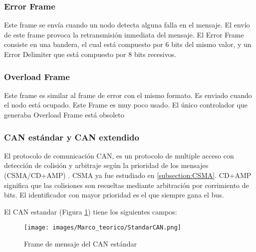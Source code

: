\subsubsection{Error Frame}
Este frame se envía cuando un nodo detecta alguna falla en el mensaje. El envío de este frame provoca la retransmisión inmediata del mensaje. El Error Frame consiste en una bandera, el cual está compuesto por 6 bits del mismo valor, y un Error Delimiter que está compuesto por 8 bits recesivos.

\subsubsection{Overload Frame}
Este frame es similar al frame de error con el mismo formato. Es enviado cuando el nodo está ocupado. Este Frame es muy poco usado. El único controlador que generaba Overload Frame está obsoleto \citep{kvaserWEB}

\subsubsection{CAN estándar y CAN extendido}
El protocolo de comunicación CAN, es un protocolo de multiple acceso con detección de colisión y arbitraje según la prioridad de los mensajes (CSMA/CD+AMP) \citep{texasCAN}. CSMA ya fue estudiado en \ref{subsection:CSMA}. CD+AMP significa que las colisiones son resueltas mediante arbitración por corrimiento de bits. El identificador con mayor prioridad es el que siempre gana el bus.

El CAN estandar (Figura \ref{fig:StandarCAN}) tiene los siguientes campos:

\begin{figure}[h]
 \centering
 \texttt{[image: images/Marco\_teorico/StandarCAN.png]}
  \caption{Frame de mensaje del CAN estándar}
\label{fig:StandarCAN}
\end{figure}

